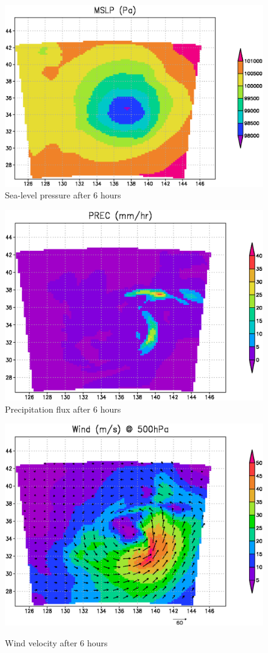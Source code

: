 \begin{figure}[tbh]
\begin{center}
  \includegraphics[width=0.55\hsize]{./figure/real_mslp.eps}\\
  \caption{Sea-level pressure after 6 hours}
  \label{fig:real_mslp}
\end{center}
\begin{center}
  \includegraphics[width=0.55\hsize]{./figure/real_prec.eps}\\
  \caption{Precipitation flux after 6 hours}
  \label{fig:real_prec}
\end{center}
\begin{center}
  \includegraphics[width=0.55\hsize]{./figure/real_wind.eps}\\
  \caption{Wind velocity after 6 hours}
  \label{fig:real_wind}
\end{center}
\end{figure}

